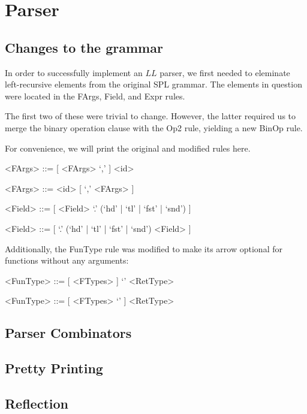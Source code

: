 \chapter{Parser}

\section{Changes to the grammar}

In order to successfully implement an $LL$ parser, we first needed to eleminate left-recursive elements from the original SPL grammar.
The elements in question were located in the \textsf{FArgs}, \textsf{Field}, and \textsf{Expr} rules.

The first two of these were trivial to change.
However, the latter required us to merge the binary operation clause with the \textsf{Op2} rule, yielding a new \textsf{BinOp} rule.

For convenience, we will print the original and modified rules here.

\begin{grammar}
<FArgs> ::= [ <FArgs> `,' ] <id> \\
\textdownarrow

<FArgs> ::= <id> [ `,' <FArgs> ]

<Field> ::= [ <Field> `.' (`hd' | `tl' | `fst' | `snd') ] \\
\textdownarrow

<Field> ::= [ `.' (`hd' | `tl' | `fst' | `snd') <Field> ]
\end{grammar}

Additionally, the \textsf{FunType} rule was modified to make its arrow optional for functions without any arguments:


\begin{grammar}
<FunType> ::= [ <FTypes> ] `\textrightarrow' <RetType> \\
\textdownarrow

<FunType> ::= [ <FTypes> `\textrightarrow' ] <RetType>
\end{grammar}


\section{Parser Combinators}

\section{Pretty Printing}

\section{Reflection}
